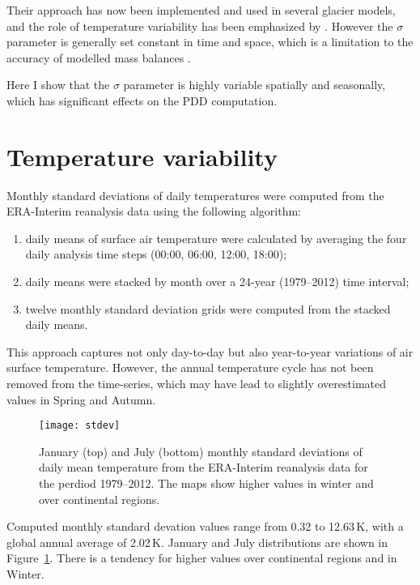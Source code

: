 \documentclass[twocolumn]{igs}
\begin{document}
Their approach has now been implemented and used in several glacier models, and the role of temperature variability has been emphasized by \citet{charbit-etal-2013}. However the $\sigma$ parameter is generally set constant in time and space, which is a limitation to the accuracy of modelled mass balances \citep{charbit-etal-2013}.

Here I show that the $\sigma$ parameter is highly variable spatially and seasonally, which has significant effects on the PDD computation.


\section{Temperature variability}

Monthly standard deviations of daily temperatures were computed from the ERA-Interim reanalysis \citep{data:erai} data using the following algorithm:

\begin{enumerate}
  \item daily means of surface air temperature were calculated by averaging the four daily analysis time steps (00:00, 06:00, 12:00, 18:00);
  \item daily means were stacked by month over a 24-year (1979--2012) time interval;
  \item twelve monthly standard deviation grids were computed from the stacked daily means.
\end{enumerate}

This approach captures not only day-to-day but also year-to-year variations of air surface temperature. However, the annual temperature cycle has not been removed from the time-series, which may have lead to slightly overestimated values in Spring and Autumn.

\begin{figure}
  \centering\texttt{[image: stdev]}
  \caption{January (top) and July (bottom) monthly standard deviations of daily mean temperature from the ERA-Interim reanalysis data for the perdiod 1979--2012. The maps show higher values in winter and over continental regions.}
  \label{fig:stdev}
\end{figure}

Computed monthly standard devation values range from 0.32 to 12.63\,K, with a global annual average of 2.02\,K. January and July distributions are shown in Figure~\ref{fig:stdev}. There is a tendency for higher values over continental regions and in Winter.
\end{document}
